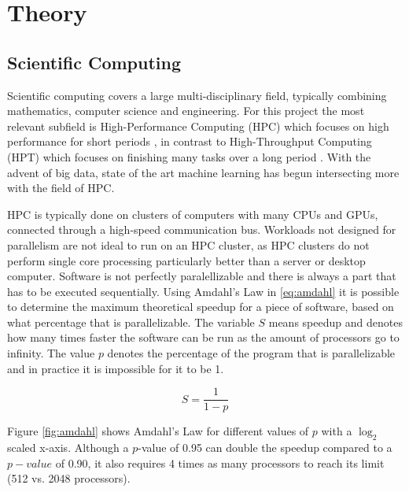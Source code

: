 \chapter{Theory}

\section{Scientific Computing}



Scientific computing covers a large multi-disciplinary field, typically combining mathematics, computer science and engineering. For this project the most relevant subfield is High-Performance Computing (HPC) which focuses on high performance for short periods \cite{larsen:hpc}, in contrast to High-Throughput Computing (HPT) which focuses on finishing many tasks over a long period \cite{wisc:htcondor}. With the advent of big data, state of the art machine learning has begun intersecting more with the field of HPC.

HPC is typically done on clusters of computers with many CPUs and GPUs, connected through a high-speed communication bus. Workloads not designed for parallelism are not ideal to run on an HPC cluster, as HPC clusters do not perform single core processing particularly better than a server or desktop computer. Software is not perfectly paralellizable and there is always a part that has to be executed sequentially. Using Amdahl's Law \cite{larsen:hpc} in \eqref{eq:amdahl} it is possible to determine the maximum theoretical speedup for a piece of software, based on what percentage that is parallelizable. The variable $S$ means speedup and denotes how many times faster the software can be run as the amount of processors go to infinity. The value $p$ denotes the percentage of the program that is parallelizable and in practice it is impossible for it to be 1.

\begin{equation} \label{eq:amdahl}
    S = \frac{1}{1 - p}
\end{equation}

Figure \ref{fig:amdahl} shows Amdahl's Law for different values of $p$ with a $\log_2$ scaled x-axis. Although a $p$-value of 0.95 can double the speedup compared to a $p-value$ of 0.90, it also requires 4 times as many processors to reach its limit (512 vs. 2048 processors).

